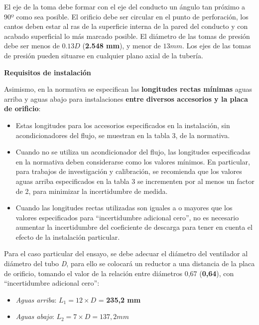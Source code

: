 El eje de la toma debe formar con el eje del conducto un ángulo tan
próximo a 90º como sea posible. El orificio debe ser circular en el
punto de perforación, los cantos deben estar al ras de la superficie
interna de la pared del conducto y con acabado superficial lo más
marcado posible. El diámetro de las tomas de presión debe ser menos de
$0.13D$ (\textbf{2.548 mm}), y menor de $13 mm$. Los ejes de las tomas de
presión pueden situarse en cualquier plano axial de la tubería.

\textbf{Requisitos de instalación}

Asimismo, en la normativa se especifican las \textbf{longitudes rectas mínimas}
aguas arriba y aguas abajo para instalaciones \textbf{entre diversos
accesorios y la placa de orificio}:

\begin{itemize}
\item
  Estas longitudes para los accesorios especificados en la instalación,
  sin acondicionadores del flujo, se muestran en la tabla 3, de la normativa.
\item
  Cuando no se utiliza un acondicionador del flujo, las longitudes
  especificadas en la normativa deben considerarse como los valores
  mínimos. En particular, para trabajos de investigación y calibración,
  se recomienda que los valores aguas arriba especificados en la tabla 3 \cite{une03}
  se incrementen por al menos un factor de 2, para minimizar la
  incertidumbre de medida.
\item
  Cuando las longitudes rectas utilizadas son iguales a o mayores que
  los valores especificados para
  ``incertidumbre adicional cero'', no es necesario aumentar la
  incertidumbre del coeficiente de descarga para tener en cuenta el
  efecto de la instalación particular.
\end{itemize}

Para el caso particular del ensayo, se debe adecuar el diámetro del
ventilador al diámetro del tubo \emph{D}, para ello se colocará un
reductor a una distancia de la placa de orificio, tomando el valor de la
relación entre diámetros 0,67 (\textbf{0,64}), con ``incertidumbre
adicional cero'':

\begin{itemize}
\item
  \emph{Aguas arriba}: $L_1 = 12\times D$ = \textbf{235,2 mm}
\item
  \emph{Aguas abajo}: $L_2 = 7\times D = 137,2 mm$
\end{itemize}

